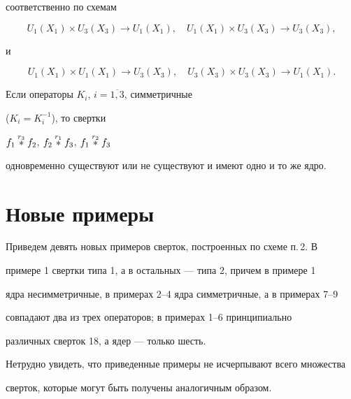 соответственно по схемам


$$


U_1(X_1)\times U_3(X_3)\to U_1(X_1),\quad


U_1(X_1)\times U_3(X_3)\to U_3(X_3),


$$


и


$$


U_1(X_1)\times U_1(X_1)\to U_3(X_3),\quad


U_3(X_3)\times U_3(X_3)\to U_1(X_1).


$$





Если операторы $K_i$, $i=\overline{1,3}$, симметричные


($K_i=K^{-1}_i$), то свертки


$f_1\overset{r_3}{\ast}{}f_2$, $f_2\overset{r_1}{\ast}{}f_3$, $f_1\overset{r_2}{\ast}{}f_3$


одновременно существуют или не существуют и имеют одно и то же ядро.





\section{Новые примеры}





Приведем девять новых примеров сверток, построенных по схеме п.\,2. В


примере 1 свертки типа 1, а в остальных --- типа 2, причем в примере 1


ядра несимметричные, в примерах 2--4 ядра симметричные, а в примерах 7--9


совпадают два из трех операторов; в примерах 1--6 принципиально


различных сверток 18, а ядер --- только шесть.





Нетрудно увидеть, что приведенные примеры не исчерпывают всего множества


сверток, которые могут быть получены аналогичным образом.


\setcounter{exam}{0}





